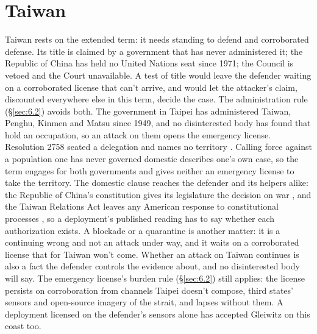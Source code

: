 \section{Taiwan}
\label{sec:E.3}
Taiwan rests on the extended term: it needs standing to defend and corroborated defense. Its title is claimed by a government that has never administered it; the Republic of China has held no United Nations seat since 1971; the Council is vetoed and the Court unavailable. A test of title would leave the defender waiting on a corroborated license that can't arrive, and would let the attacker's claim, discounted everywhere else in this term, decide the case. The administration rule (\S\ref{sec:6.2}) avoids both. The government in Taipei has administered Taiwan, Penghu, Kinmen and Matsu since 1949, and no disinterested body has found that hold an occupation, so an attack on them opens the emergency license. Resolution 2758 seated a delegation and names no territory \autocite{unga1971res2758}. Calling force against a population one has never governed domestic describes one's own case, so the term engages for both governments and gives neither an emergency license to take the territory. The domestic clause reaches the defender and its helpers alike: the Republic of China's constitution gives its legislature the decision on war \autocite{roc1947constitution}, and the Taiwan Relations Act leaves any American response to constitutional processes \autocite{tra1979}, so a deployment's published reading has to say whether each authorization exists. A blockade or a quarantine is another matter: it is a continuing wrong and not an attack under way, and it waits on a corroborated license that for Taiwan won't come. Whether an attack on Taiwan continues is also a fact the defender controls the evidence about, and no disinterested body will say. The emergency license's burden rule (\S\ref{sec:6.2}) still applies: the license persists on corroboration from channels Taipei doesn't compose, third states' sensors and open-source imagery of the strait, and lapses without them. A deployment licensed on the defender's sensors alone has accepted Gleiwitz on this coast too.
